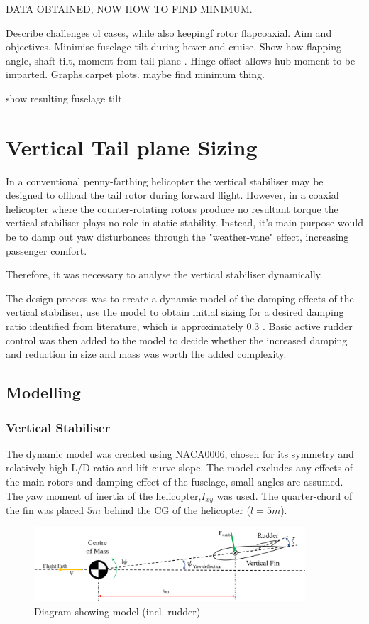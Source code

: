 \documentclass[11pt,a4paper]{article}
\begin{document}
DATA OBTAINED, NOW HOW TO FIND MINIMUM.

Describe challenges ol cases, while also keepingf  rotor flapcoaxial.
Aim and objectives.
Minimise fuselage tilt during hover and cruise.
Show how flapping angle, shaft tilt, moment from tail plane .
Hinge offset allows hub moment to be imparted.
Graphs.carpet plots. maybe find minimum thing.

show resulting fuselage tilt.

\section{Vertical Tail plane Sizing}



In a conventional penny-farthing helicopter the vertical stabiliser may be designed to offload the tail rotor during forward flight. However, in a coaxial helicopter where the counter-rotating rotors produce no resultant torque the vertical stabiliser plays no role in static stability. Instead, it's main purpose would be to damp out yaw disturbances through the "weather-vane" effect, increasing passenger comfort.

Therefore, it was necessary to analyse the vertical stabiliser dynamically.

The design process was to create a dynamic model of the damping effects of the vertical stabiliser, use the model to obtain initial sizing for a desired damping ratio identified from literature, which is approximately 0.3 \cite{prouty}. Basic active rudder control was then added to the model to decide whether the increased damping and reduction in size and mass was worth the added complexity.
\subsection{Modelling}
\subsubsection{Vertical Stabiliser}
The dynamic model was created using NACA0006, chosen for its symmetry and relatively high L/D ratio and lift curve slope. The model excludes any effects of the main rotors and damping effect of the fuselage, small angles are assumed. The yaw moment of inertia of the helicopter,$I_{xy}$ was used. The quarter-chord of the fin was placed $5m$ behind the CG of the helicopter ($l=5m$). 
\begin{figure}[H]
	\centering
	\includegraphics[width=0.9\textwidth]{VertStabdiag.PNG}
	\caption{Diagram showing model (incl. rudder)}
	\centering
	\label{fig:vertdiag}
\end{figure}
\end{document}
